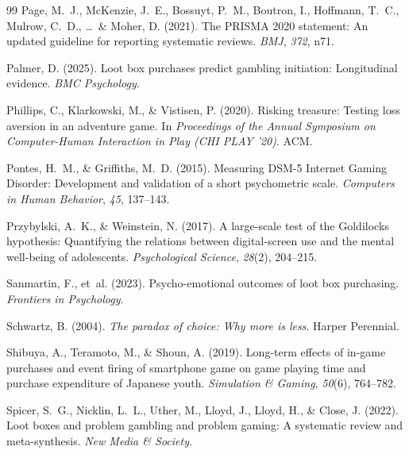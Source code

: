 \documentclass[12pt]{article}
\begin{document}
\begin{thebibliography}{99}
Page, M.~J., McKenzie, J.~E., Bossuyt, P.~M., Boutron, I., Hoffmann, T.~C., Mulrow, C.~D., \ldots\ \& Moher, D. (2021).
\newblock The PRISMA 2020 statement: An updated guideline for reporting systematic reviews.
\newblock \textit{BMJ}, \textit{372}, n71.

Palmer, D. (2025).
\newblock Loot box purchases predict gambling initiation: Longitudinal evidence.
\newblock \textit{BMC Psychology}.

Phillips, C., Klarkowski, M., \& Vistisen, P. (2020).
\newblock Risking treasure: Testing loss aversion in an adventure game.
\newblock In \textit{Proceedings of the Annual Symposium on Computer-Human Interaction in Play (CHI PLAY '20)}. ACM.

Pontes, H.~M., \& Griffiths, M.~D. (2015).
\newblock Measuring DSM-5 Internet Gaming Disorder: Development and validation of a short psychometric scale.
\newblock \textit{Computers in Human Behavior}, \textit{45}, 137--143.

Przybylski, A.~K., \& Weinstein, N. (2017).
\newblock A large-scale test of the Goldilocks hypothesis: Quantifying the relations between digital-screen use and the mental well-being of adolescents.
\newblock \textit{Psychological Science}, \textit{28}(2), 204--215.

Sanmartin, F., et~al. (2023).
\newblock Psycho-emotional outcomes of loot box purchasing.
\newblock \textit{Frontiers in Psychology}.

Schwartz, B. (2004).
\newblock \textit{The paradox of choice: Why more is less}.
\newblock Harper Perennial.

Shibuya, A., Teramoto, M., \& Shoun, A. (2019).
\newblock Long-term effects of in-game purchases and event firing of smartphone game on game playing time and purchase expenditure of Japanese youth.
\newblock \textit{Simulation \& Gaming}, \textit{50}(6), 764--782.

Spicer, S.~G., Nicklin, L.~L., Uther, M., Lloyd, J., Lloyd, H., \& Close, J. (2022).
\newblock Loot boxes and problem gambling and problem gaming: A systematic review and meta-synthesis.
\newblock \textit{New Media \& Society}.


\end{thebibliography}
\end{document}
